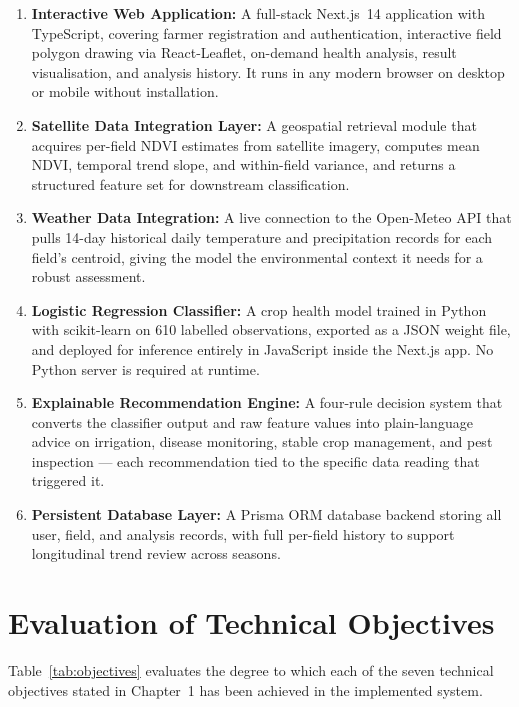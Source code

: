 \documentclass[12pt,a4paper]{report}
\begin{document}
\begin{enumerate}
  \item \textbf{Interactive Web Application:} A full-stack Next.js~14 application with TypeScript, covering farmer registration and authentication, interactive field polygon drawing via React-Leaflet, on-demand health analysis, result visualisation, and analysis history. It runs in any modern browser on desktop or mobile without installation.

  \item \textbf{Satellite Data Integration Layer:} A geospatial retrieval module that acquires per-field NDVI estimates from satellite imagery, computes mean NDVI, temporal trend slope, and within-field variance, and returns a structured feature set for downstream classification.

  \item \textbf{Weather Data Integration:} A live connection to the Open-Meteo API that pulls 14-day historical daily temperature and precipitation records for each field's centroid, giving the model the environmental context it needs for a robust assessment.

  \item \textbf{Logistic Regression Classifier:} A crop health model trained in Python with scikit-learn on 610 labelled observations, exported as a JSON weight file, and deployed for inference entirely in JavaScript inside the Next.js app. No Python server is required at runtime.

  \item \textbf{Explainable Recommendation Engine:} A four-rule decision system that converts the classifier output and raw feature values into plain-language advice on irrigation, disease monitoring, stable crop management, and pest inspection — each recommendation tied to the specific data reading that triggered it.

  \item \textbf{Persistent Database Layer:} A Prisma ORM database backend storing all user, field, and analysis records, with full per-field history to support longitudinal trend review across seasons.
\end{enumerate}

\section{Evaluation of Technical Objectives}

Table~\ref{tab:objectives} evaluates the degree to which each of the seven technical objectives stated in Chapter~1 has been achieved in the implemented system.
\end{document}
